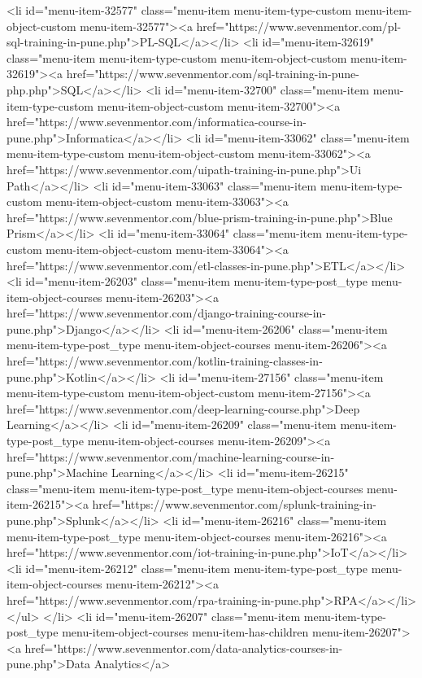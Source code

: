{<li id="menu-item-32577" class="menu-item menu-item-type-custom menu-item-object-custom menu-item-32577"><a href="https://www.sevenmentor.com/pl-sql-training-in-pune.php">PL-SQL</a></li>
<li id="menu-item-32619" class="menu-item menu-item-type-custom menu-item-object-custom menu-item-32619"><a href="https://www.sevenmentor.com/sql-training-in-pune-php.php">SQL</a></li>
<li id="menu-item-32700" class="menu-item menu-item-type-custom menu-item-object-custom menu-item-32700"><a href="https://www.sevenmentor.com/informatica-course-in-pune.php">Informatica</a></li>
<li id="menu-item-33062" class="menu-item menu-item-type-custom menu-item-object-custom menu-item-33062"><a href="https://www.sevenmentor.com/uipath-training-in-pune.php">Ui Path</a></li>
<li id="menu-item-33063" class="menu-item menu-item-type-custom menu-item-object-custom menu-item-33063"><a href="https://www.sevenmentor.com/blue-prism-training-in-pune.php">Blue Prism</a></li>
<li id="menu-item-33064" class="menu-item menu-item-type-custom menu-item-object-custom menu-item-33064"><a href="https://www.sevenmentor.com/etl-classes-in-pune.php">ETL</a></li>
<li id="menu-item-26203" class="menu-item menu-item-type-post_type menu-item-object-courses menu-item-26203"><a href="https://www.sevenmentor.com/django-training-course-in-pune.php">Django</a></li>
<li id="menu-item-26206" class="menu-item menu-item-type-post_type menu-item-object-courses menu-item-26206"><a href="https://www.sevenmentor.com/kotlin-training-classes-in-pune.php">Kotlin</a></li>
<li id="menu-item-27156" class="menu-item menu-item-type-custom menu-item-object-custom menu-item-27156"><a href="https://www.sevenmentor.com/deep-learning-course.php">Deep Learning</a></li>
<li id="menu-item-26209" class="menu-item menu-item-type-post_type menu-item-object-courses menu-item-26209"><a href="https://www.sevenmentor.com/machine-learning-course-in-pune.php">Machine Learning</a></li>
<li id="menu-item-26215" class="menu-item menu-item-type-post_type menu-item-object-courses menu-item-26215"><a href="https://www.sevenmentor.com/splunk-training-in-pune.php">Splunk</a></li>
<li id="menu-item-26216" class="menu-item menu-item-type-post_type menu-item-object-courses menu-item-26216"><a href="https://www.sevenmentor.com/iot-training-in-pune.php">IoT</a></li>
<li id="menu-item-26212" class="menu-item menu-item-type-post_type menu-item-object-courses menu-item-26212"><a href="https://www.sevenmentor.com/rpa-training-in-pune.php">RPA</a></li>
</ul>
</li>
<li id="menu-item-26207" class="menu-item menu-item-type-post_type menu-item-object-courses menu-item-has-children menu-item-26207"><a href="https://www.sevenmentor.com/data-analytics-courses-in-pune.php">Data Analytics</a>
}
